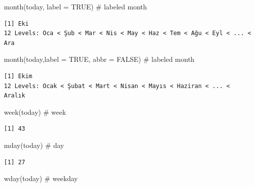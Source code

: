 \documentclass[
  letterpaper,
  DIV=11,
  numbers=noendperiod]{scrreprt}
\newenvironment{Shaded}{\begin{snugshade}}{\end{snugshade}}
\newcommand{\AttributeTok}[1]{\textcolor[rgb]{0.40,0.45,0.13}{#1}}
\newcommand{\CommentTok}[1]{\textcolor[rgb]{0.37,0.37,0.37}{#1}}
\newcommand{\ConstantTok}[1]{\textcolor[rgb]{0.56,0.35,0.01}{#1}}
\newcommand{\FunctionTok}[1]{\textcolor[rgb]{0.28,0.35,0.67}{#1}}
\newcommand{\NormalTok}[1]{\textcolor[rgb]{0.00,0.23,0.31}{#1}}
\begin{document}
\begin{Shaded}
\begin{Highlighting}[]
\FunctionTok{month}\NormalTok{(today, }\AttributeTok{label =} \ConstantTok{TRUE}\NormalTok{) }\CommentTok{\# labeled month}
\end{Highlighting}
\end{Shaded}

\begin{verbatim}
[1] Eki
12 Levels: Oca < Şub < Mar < Nis < May < Haz < Tem < Ağu < Eyl < ... < Ara
\end{verbatim}

\begin{Shaded}
\begin{Highlighting}[]
\FunctionTok{month}\NormalTok{(today,}\AttributeTok{label =} \ConstantTok{TRUE}\NormalTok{, }\AttributeTok{abbr =} \ConstantTok{FALSE}\NormalTok{) }\CommentTok{\# labeled month}
\end{Highlighting}
\end{Shaded}

\begin{verbatim}
[1] Ekim
12 Levels: Ocak < Şubat < Mart < Nisan < Mayıs < Haziran < ... < Aralık
\end{verbatim}

\begin{Shaded}
\begin{Highlighting}[]
\FunctionTok{week}\NormalTok{(today) }\CommentTok{\# week}
\end{Highlighting}
\end{Shaded}

\begin{verbatim}
[1] 43
\end{verbatim}

\begin{Shaded}
\begin{Highlighting}[]
\FunctionTok{mday}\NormalTok{(today) }\CommentTok{\# day}
\end{Highlighting}
\end{Shaded}

\begin{verbatim}
[1] 27
\end{verbatim}

\begin{Shaded}
\begin{Highlighting}[]
\FunctionTok{wday}\NormalTok{(today) }\CommentTok{\# weekday}
\end{Highlighting}
\end{Shaded}
\end{document}
